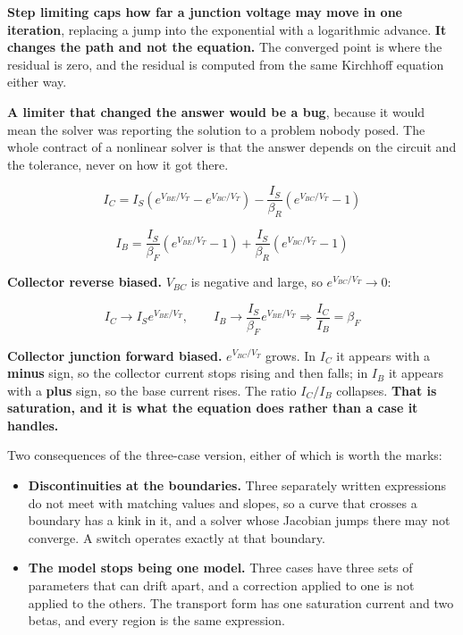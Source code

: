 \textbf{Step limiting caps how far a junction voltage may move in one iteration}, replacing a jump into the exponential with a logarithmic advance. \textbf{It changes the path and not the equation.} The converged point is where the residual is zero, and the residual is computed from the same Kirchhoff equation either way.

\textbf{A limiter that changed the answer would be a bug}, because it would mean the solver was reporting the solution to a problem nobody posed. The whole contract of a nonlinear solver is that the answer depends on the circuit and the tolerance, never on how it got there.



\[
  I_C = I_S\left(e^{V_{BE}/V_T} - e^{V_{BC}/V_T}\right)
  - \frac{I_S}{\beta_R}\left(e^{V_{BC}/V_T}-1\right)
\]

\[
  I_B = \frac{I_S}{\beta_F}\left(e^{V_{BE}/V_T}-1\right)
  + \frac{I_S}{\beta_R}\left(e^{V_{BC}/V_T}-1\right)
\]

\textbf{Collector reverse biased.} $V_{BC}$ is negative and large, so $e^{V_{BC}/V_T} \to 0$:

\[
  I_C \to I_S e^{V_{BE}/V_T}, \qquad I_B \to \frac{I_S}{\beta_F}e^{V_{BE}/V_T}
  \Rightarrow \frac{I_C}{I_B} = \beta_F
\]

\textbf{Collector junction forward biased.} $e^{V_{BC}/V_T}$ grows. In $I_C$ it appears with a \textbf{minus} sign, so the collector current stops rising and then falls; in $I_B$ it appears with a \textbf{plus} sign, so the base current rises. The ratio $I_C/I_B$ collapses. \textbf{That is saturation, and it is what the equation does rather than a case it handles.}


Two consequences of the three-case version, either of which is worth the marks:

\begin{itemize}
  \item \textbf{Discontinuities at the boundaries.} Three separately written expressions do not meet with matching values and slopes, so a curve that crosses a boundary has a kink in it, and a solver whose Jacobian jumps there may not converge. A switch operates exactly at that boundary.
  \item \textbf{The model stops being one model.} Three cases have three sets of parameters that can drift apart, and a correction applied to one is not applied to the others. The transport form has one saturation current and two betas, and every region is the same expression.
\end{itemize}


